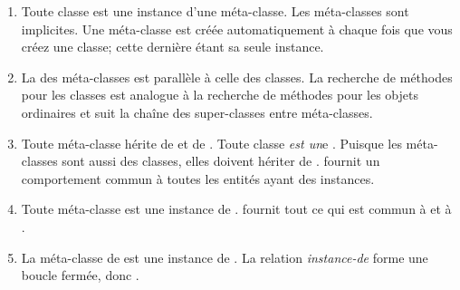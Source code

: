 \documentclass[a4paper,10pt,twoside]{book}
\begin{document}
\begin{enumerate}

\item Toute classe est une instance d'une méta-classe.
Les méta-classes sont implicites.
Une méta-classe est créée automatiquement à chaque fois que vous créez une classe; cette dernière étant sa seule instance.


\item La  des méta-classes est parallèle à celle des classes.
La recherche de méthodes pour les classes est analogue à la recherche de méthodes pour les objets ordinaires et suit la chaîne des super-classes entre méta-classes.


\item Toute méta-classe hérite de  et de .
Toute classe \emph{est un}{}e .
Puisque les méta-classes sont aussi des classes, elles doivent hériter de  .
	 fournit un comportement commun à toutes les entités ayant des instances.

\item Toute méta-classe est une instance de .
	 fournit tout ce qui est commun à  et à .
	

\item La méta-classe de  est une instance de .
	La relation \emph{instance-de} forme une boucle fermée, donc \mbox{.}
\end{enumerate}

\ifx\wholebook\relax\else
\end{document}
